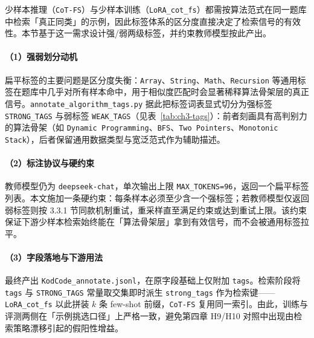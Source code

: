 
少样本推理（\texttt{CoT-FS}）与少样本训练（\texttt{LoRA\_cot\_fs}）都需按算法范式在同一题库中检索「真正同类」的示例，因此标签体系的区分度直接决定了检索信号的有效性。本节基于这一需求设计强/弱两级标签，并约束教师模型按此产出。

\paragraph{（1）强弱划分动机}
扁平标签的主要问题是区分度失衡：\texttt{Array}、\texttt{String}、\texttt{Math}、\texttt{Recursion} 等通用标签在题库中几乎对所有样本命中，用于相似度匹配时会显著稀释算法骨架层的真正信号。\texttt{annotate\_algorithm\_tags.py} 据此把标签词表显式切分为强标签 \texttt{STRONG\_TAGS} 与弱标签 \texttt{WEAK\_TAGS}（见表~\ref{tab:ch3-tags}）：前者刻画具有高判别力的算法骨架（如 \texttt{Dynamic Programming}、\texttt{BFS}、\texttt{Two Pointers}、\texttt{Monotonic Stack}），后者保留通用数据类型与宽泛范式作为辅助描述。

\paragraph{（2）标注协议与硬约束}
教师模型仍为 \texttt{deepseek-chat}，单次输出上限 \texttt{MAX\_TOKENS=96}，返回一个扁平标签列表。本文施加一条硬约束：每条样本必须至少含一个强标签；若教师模型仅返回弱标签则按 3.3.1 节同款机制重试，重采样直至满足约束或达到重试上限。该约束保证下游少样本检索始终能在「算法骨架层」拿到有效信号，而不会被通用标签拉平。

\paragraph{（3）字段落地与下游用法}
最终产出 \texttt{KodCode\_annotate.jsonl}，在原字段基础上仅附加 \texttt{tags}。检索阶段将 \texttt{tags} 与 \texttt{STRONG\_TAGS} 常量取交集即时派生 \texttt{strong\_tags} 作为检索键——\texttt{LoRA\_cot\_fs} 以此拼装 $k$ 条 few-shot 前缀，\texttt{CoT-FS} 复用同一索引。由此，训练与评测两侧在「示例挑选口径」上严格一致，避免第四章 H9/H10 对照中出现由检索策略漂移引起的假阳性增益。

